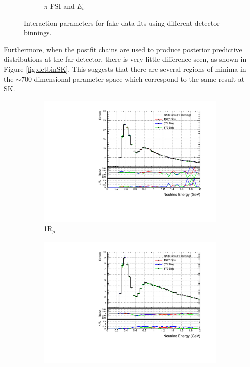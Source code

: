 \begin{figure}
\begin{subfigure}{0.49\textwidth}
  \caption{$\pi$ FSI and $E_b$}
\end{subfigure}
\caption{Interaction parameters for fake data fits using different detector binnings.}
\label{fig:detcovbinxsec}
\end{figure}

Furthermore, when the postfit chains are used to produce posterior predictive distributions at the far detector, there is very little difference seen, as shown in Figure \ref{fig:detbinSK}. This suggests that there are several regions of minima in the $\sim$700 dimensional parameter space which correspond to the same result at SK. 

\begin{figure}
\centering
\begin{subfigure}{.49\textwidth}
  \centering
  \includegraphics[width=0.95\linewidth]{figs/detbin_numu}
  \caption{1R$_{\mu}$}
\end{subfigure}
\begin{subfigure}{.49\textwidth}
  \centering
  \includegraphics[width=0.95\linewidth]{figs/detbin_numubar}

\end{subfigure}
\end{figure}
